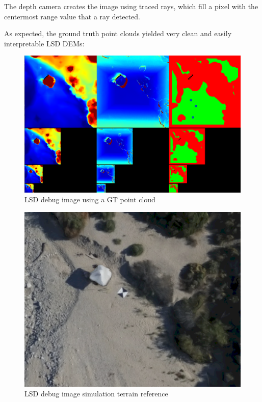 The depth camera creates the image using traced rays, which fill a pixel with the centermost range value that a ray detected.

As expected, the ground truth point clouds yielded very clean and easily interpretable LSD DEMs:

\begin{figure}[h]
\centering
\includegraphics[scale=0.25]{images/methodology/lsd_debug_image.png}
\caption{LSD debug image using a GT point cloud}
\label{fig:gt_lsd_debug}
\end{figure}

\begin{figure}[h]
\centering
\includegraphics[scale=0.25]{images/methodology/lsd_debug_reference.png}
\caption{LSD debug image simulation terrain reference}
\label{fig:gt_lsd_debug_reference}
\end{figure}
\clearpage %

